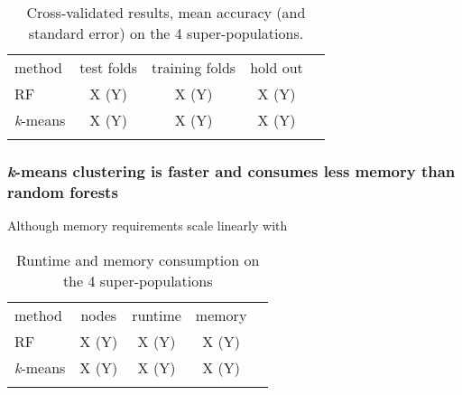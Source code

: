 \documentclass{llncs}
\newcommand{\kMeans}{\textit{k}-means}
\begin{document}
{ 

\begin{table}
\caption{Cross-validated results, mean accuracy (and standard error) on the 4 super-populations.}
\begin{center}
\renewcommand{\arraystretch}{1.4}
\setlength\tabcolsep{3pt}
\begin{tabular}{lcccc}
\hline\noalign{\smallskip}
method  & test folds & training folds & hold out \\
RF  & X (Y) & X (Y) & X (Y) \\
\kMeans & X (Y) & X (Y) & X (Y) \\
\noalign{\smallskip}
\hline
\end{tabular}
\end{center}
\end{table}







\subsubsection{\kMeans{} clustering is faster and consumes less memory than random forests}

Although memory requirements scale linearly with 



\begin{table}
\caption{Runtime and memory consumption on the 4 super-populations}
\begin{center}
\renewcommand{\arraystretch}{1.4}
\setlength\tabcolsep{3pt}
\begin{tabular}{lcccc}
\hline\noalign{\smallskip}
method  & nodes & runtime & memory \\
RF  & X (Y) & X (Y) & X (Y) \\
\kMeans & X (Y) & X (Y) & X (Y) \\
\noalign{\smallskip}
\hline
\end{tabular}
\end{center}
\end{table}




}
\end{document}
